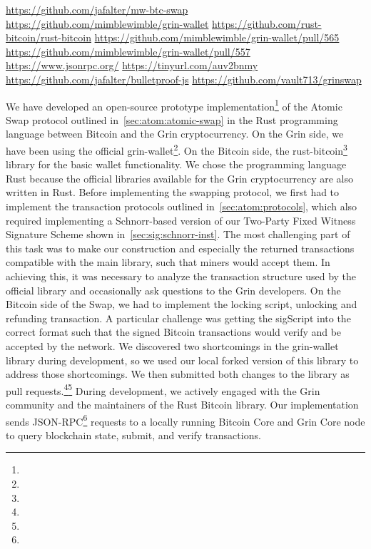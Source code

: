 \urldef\urlgithub\url{https://github.com/jafalter/mw-btc-swap}
\urldef\urlgrinwallet\url{https://github.com/mimblewimble/grin-wallet}
\urldef\urlrustbitcoin\url{https://github.com/rust-bitcoin/rust-bitcoin}
\urldef\urlprone\url{https://github.com/mimblewimble/grin-wallet/pull/565}
\urldef\urlprtwo\url{https://github.com/mimblewimble/grin-wallet/pull/557}
\urldef\urljsonrpc\url{https://www.jsonrpc.org/}
\urldef\urlrpbytes\url{https://tinyurl.com/auv2bnmy}
\urldef\urlbpjs\url{https://github.com/jafalter/bulletproof-js}
\urldef\urlgrnswp\url{https://github.com/vault713/grinswap}

We have developed an open-source prototype implementation\footnote{\urlgithub} of the Atomic Swap protocol outlined in~\cref{sec:atom:atomic-swap} in the Rust programming language between Bitcoin and the Grin cryptocurrency.
On the Grin side, we have been using the official grin-wallet\footnote{\urlgrinwallet}.
On the Bitcoin side, the rust-bitcoin\footnote{\urlrustbitcoin} library for the basic wallet functionality.
We chose the programming language Rust because the official libraries available for the Grin cryptocurrency are also written in Rust.
Before implementing the swapping protocol, we first had to implement the transaction protocols outlined in~\cref{sec:atom:protocols}, which also required implementing a Schnorr-based version of our Two-Party Fixed Witness Signature Scheme shown in~\cref{sec:sig:schnorr-inst}.
The most challenging part of this task was to make our construction and especially the returned transactions compatible with the main library, such that miners would accept them.
In achieving this, it was necessary to analyze the transaction structure used by the official library and occasionally ask questions to the Grin developers.
On the Bitcoin side of the Swap, we had to implement the locking script, unlocking and refunding transaction.
A particular challenge was getting the sigScript into the correct format such that the signed Bitcoin transactions would verify and be accepted by the network.
We discovered two shortcomings in the grin-wallet library during development, so we used our local forked version of this library to address those shortcomings.
We then submitted both changes to the library as pull requests.\footnote{\urlprone}\footnote{\urlprtwo}
During development, we actively engaged with the Grin community and the maintainers of the Rust Bitcoin library.
Our implementation sends JSON-RPC\footnote{\urljsonrpc} requests to a locally running Bitcoin Core and Grin Core node to query blockchain state, submit, and verify transactions.
